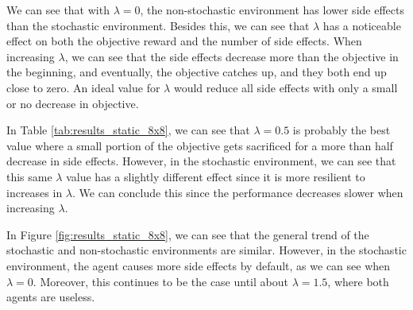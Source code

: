 \documentclass[12pt,A4]{report}
\theoremstyle{definition}
\begin{document}
We can see that with $\lambda=0$, the non-stochastic environment has lower side effects than the stochastic environment. Besides this, we can see that $\lambda$ has a noticeable effect on both the objective reward and the number of side effects. When increasing $\lambda$, we can see that the side effects decrease more than the objective in the beginning, and eventually, the objective catches up, and they both end up close to zero. An ideal value for $\lambda$ would reduce all side effects with only a small or no decrease in objective.

In Table \ref{tab:results_static_8x8}, we can see that $\lambda = 0.5$ is probably the best value where a small portion of the objective gets sacrificed for a more than half decrease in side effects. However, in the stochastic environment, we can see that this same $\lambda$ value has a slightly different effect since it is more resilient to increases in $\lambda$. We can conclude this since the performance decreases slower when increasing $\lambda$.

In Figure \ref{fig:results_static_8x8}, we can see that the general trend of the stochastic and non-stochastic environments are similar. However, in the stochastic environment, the agent causes more side effects by default, as we can see when $\lambda=0$. Moreover, this continues to be the case until about $\lambda=1.5$, where both agents are useless. 



\end{document}
